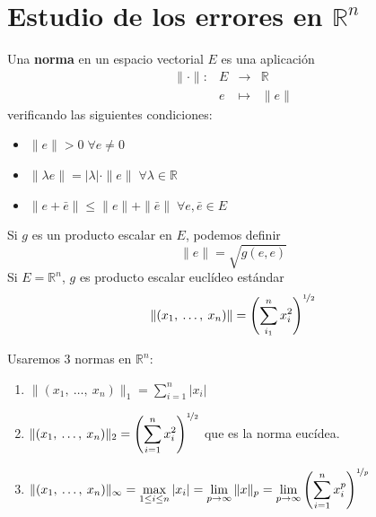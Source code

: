     \section{Estudio de los errores en $\mathbb{R}^n$}


    \begin{defin}
        Una \textbf{norma} en un espacio vectorial $E$ es una aplicación
        $$\begin{array}{rrcl}
             \|\cdot \| : & E & \longrightarrow & \mathbb R   \\
              \: & e & \longmapsto & \|e\| 
        \end{array}$$
        verificando las siguientes condiciones: \vspace{-5mm}
        \begin{itemize}
         \item[a)] $\|e\|>0\;\forall e\neq 0$
         \item[b)]$\|\lambda e\|=|\lambda|\cdot \|e\|\;\forall \lambda\in \mathbb{R}$
         \item[c)]$\|e+\bar{e}\|\leq \|e\|+\|\bar{e}\|\;\forall e,\bar{e}\in E$
        \end{itemize}
    \end{defin}
    \begin{ejem}
    Si $g$ es un producto escalar en $E$, podemos definir 
        $$\|e\|=\sqrt{g(e,e)}$$
Si $E = \mathbb R^n$, $g$ es producto escalar euclídeo estándar 
$$\|(x_1, \:\ldots, \: x_n)\|=\left( \sum_{i_1}^{n} x_i^2\right)^{\nicefrac{1}{2}}$$
    \end{ejem}
    \begin{obs}
        Usaremos 3 normas en $\mathbb R^n$: 
        \begin{enumerate}
            \item $\displaystyle \|(x_1, \: \ldots,  \: x_n)\|_1= \sum_{i=1}^{n} |x_i| $
            \item $\displaystyle \|(x_1, \: \ldots, \: x_n)\|_2=\left( \sum_{i=1}^{n} x_i^2\right)^{\nicefrac{1}{2}}$ que es la norma eucídea. 
            \item $\displaystyle \|(x_1, \: \ldots, \: x_n)\|_{\infty}=\max_{1 \leq i \leq n}|x_i|=\lim_{p \to \infty} \|x\|_p = \lim_{p \to \infty} \left( \sum_{i=1}^{n} x_i^p\right)^{\nicefrac{1}{p}} $
        \end{enumerate}
    \end{obs}
    
